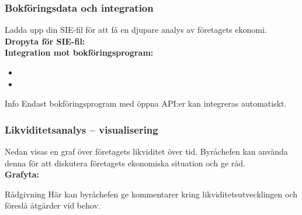\documentclass[10pt]{beamer}
\begin{document}
\begin{frame}[label=layering]
  \frametitle{Bokföringsdata och integration}
  \small
  Ladda upp din SIE-fil för att få en djupare analys av företagets ekonomi.\
  \vspace{0.5cm}
  \textbf{Dropyta för SIE-fil:} \fbox{\rule{6cm}{0.7cm}} \\
  \vspace{0.5cm}
  \textbf{Integration mot bokföringsprogram:}
  \begin{itemize}
    \item {}
    \item {}
  \end{itemize}
  \vspace{0.5cm}
  \begin{block}{Info}
    Endast bokföringsprogram med öppna API:er kan integreras automatiskt.\
  \end{block}
  \vspace{0.8cm}
  \begin{flushright}
    \hyperlink{nextslide}{}
  \end{flushright}
\end{frame}

\begin{frame}[label=likviditetsgraf]
  \frametitle{Likviditetsanalys – visualisering}
  \small
  Nedan visas en graf över företagets likviditet över tid. Byråchefen kan använda denna för att diskutera företagets ekonomiska situation och ge råd.\\
  \vspace{0.5cm}
  \textbf{Grafyta:} \fbox{\rule{10cm}{4cm}} \\
  \vspace{0.5cm}
  \begin{block}{Rådgivning}
    Här kan byråchefen ge kommentarer kring likviditetsutvecklingen och föreslå åtgärder vid behov.
  \end{block}
  \vspace{0.8cm}
  \begin{flushright}
    \hyperlink{nextslide}{}
  \end{flushright}
\end{frame}
\end{document}
